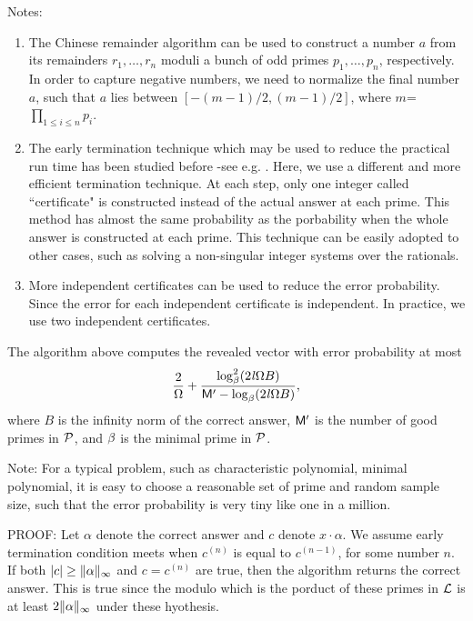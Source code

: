 Notes:
\begin{enumerate}
\item
The Chinese remainder algorithm can be used to construct a number $a$ from
its remainders $r_1, \ldots, r_n$ moduli a bunch of odd primes $p_1, \ldots, p_n$, respectively.
In order to capture negative numbers, 
we need to normalize the final number $a$, 
such that $a$ lies between $[-(m-1)/2, (m-1)/2]$, 
where $m$=$\prod_{1\leq i \leq n} p_i$.
\item
The early termination technique which may be used to reduce the practical run time
has been studied before -see e.g. \cite{Emiris98,Kaltofen02, Eberly03}.
Here, we use a different and more efficient termination technique.
At each step, only one integer called ``certificate" is constructed 
instead of the actual answer at each prime. This method has almost
the same probability as the porbability when the whole answer is constructed at each prime.
This technique can be easily adopted to other cases,
such as solving a non-singular integer systems over the rationals.
\item
More independent certificates can be used to reduce the error probability.
Since the error for each independent certificate is independent.
In practice, we use two independent certificates.
\end{enumerate}
\begin{theorem}
The algorithm above computes the revealed vector with error probability at most 
\[\frac{2}{\Omega} +
\frac{\log^2_{\beta}(2\mathit l \Omega B)}
{\mathsf M^\prime - \log_{\beta}(2\mathit l \Omega B)},\]
where $B$ is the infinity norm of the correct answer,
$\mathsf M^\prime$ is the number of good primes in $\mathcal P$,
and $\beta$ is the minimal prime in $\mathcal P$.
\end{theorem}

Note: For a typical problem, such as characteristic polynomial, 
minimal polynomial, it is easy to choose a reasonable set of prime 
and random sample size,
such that the error probability is very tiny like one in a million.

PROOF:
Let $\alpha$ denote the correct answer and
$c$ denote $x \cdot \alpha$. 
We assume early termination condition meets when 
$c^{(n)}$ is equal to $c^{(n-1)}$, for some number $n$. 
If both $|c| \geq \|\alpha\|_\infty$ and
$c = c^{(n)}$ are true, then the algorithm returns the correct answer.
This is true since the modulo which is the porduct of these primes in $\mathcal L$ is at least 
$2 \|\alpha\|_\infty$ under these hyothesis.

